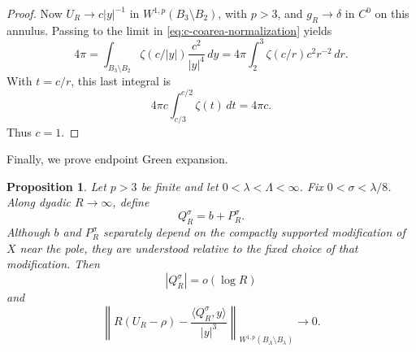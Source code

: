 \documentclass[11pt]{amsart}
\numberwithin{equation}{section}
\newtheorem{proposition}[theorem]{Proposition}
\theoremstyle{definition}
\newcommand{\rhoE}{\rho}
\newcommand{\ip}[2]{\langle #1,#2\rangle}
\newcommand{\abs}[1]{\left\lvert #1\right\rvert}
\begin{document}
\begin{proof}
Now $U_R\to c\abs y^{-1}$ in $W^{1,p}(B_3\setminus B_2)$, with $p>3$, and $g_R\to \delta$ in $C^0$ on this annulus.  Passing to the limit in \eqref{eq:c-coarea-normalization} yields
$$
        4\pi
        =\int_{B_3\setminus B_2}
        \zeta(c/\abs y)\frac{c^2}{\abs y^4}\,dy
        =4\pi\int_2^3 \zeta(c/r)c^2 r^{-2}\,dr.
$$
With $t=c/r$, this last integral is
$$
        4\pi c\int_{c/3}^{c/2}\zeta(t)\,dt=4\pi c.
$$
Thus $c=1$.
\end{proof}

Finally, we prove endpoint Green expansion.
\begin{proposition}\label{prop:endpoint-green}
Let $p>3$ be finite and let $0<\lambda<\Lambda<\infty$.  Fix $0<\sigma<\lambda/8$.  Along dyadic $R\to\infty$, define
\begin{equation}\label{eq:Q-R-def}
        Q_R^\sigma=b+P_R^\sigma.
\end{equation}
Although $b$ and $P_R^\sigma$ separately depend on the compactly supported modification of $X$ near the pole, they are understood relative to the fixed choice of that modification.  Then
\begin{equation}\label{eq:Q-growth}
        \abs{Q_R^\sigma}=o(\log R)
\end{equation}
and
\begin{equation}\label{eq:endpoint-green}
        \left\|R\left(U_R-\rhoE\right)-\frac{\ip{Q_R^\sigma}{y}}{\abs y^3}\right\|_{W^{1,p}(B_\Lambda\setminus B_\lambda)}\to0.
\end{equation}
\end{proposition}
\end{document}
